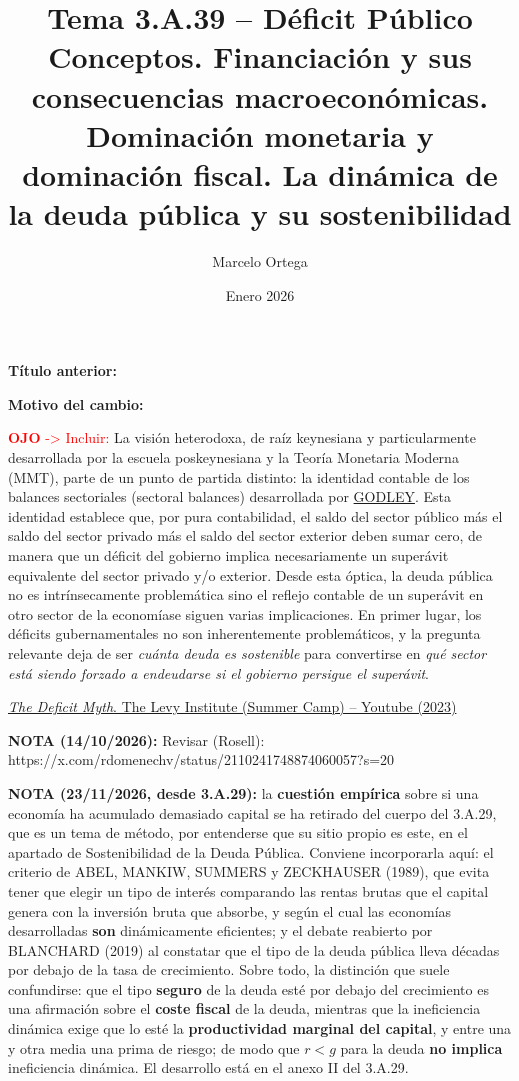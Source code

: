 \documentclass[10pt,a4paper]{article}
\title{Tema 3.A.39 -- Déficit Público\\
\large Conceptos. Financiación y sus consecuencias macroeconómicas. Dominación monetaria y dominación fiscal. La dinámica de la deuda pública y su sostenibilidad}
\author{Marcelo Ortega}
\date{Enero 2026}
\newcommand{\puntosclave}[1]{%
  \begin{tcolorbox}[
    colframe=black,
    title={Puntos clave},
    before upper={\setlength{\parindent}{0.5cm}\setlength{\parskip}{0.5\baselineskip}}
  ]
  #1
  \end{tcolorbox}
}
\newcommand{\modificaciones}[1]{
  \begin{tcolorbox}[
    colback=white,
    colframe=red,
    title={Modificaciones a realizar},
    before upper={\setlength{\parindent}{0.5cm}\setlength{\parskip}{0.5\baselineskip}}
  ]
  #1
  \end{tcolorbox}
}
\newcommand{\changebox}{%
\begin{tcolorbox}[title={Historial de cambios del tema}]
\textbf{Título anterior:} \OldTitle\par
\textbf{Motivo del cambio:} \ChangeWhy
\end{tcolorbox}
}
\newcounter{anexo}
\begin{document}
\maketitle
\changebox

\newpage

\puntosclave{ %
     
     
    }
\vspace{1cm}

\modificaciones{
    \textcolor{red}{\textbf{OJO} -> Incluir:} La visión heterodoxa, de raíz keynesiana y particularmente desarrollada por la escuela poskeynesiana y la Teoría Monetaria Moderna (MMT), parte de un punto de partida distinto: la identidad contable de los balances sectoriales (sectoral balances) desarrollada por \href{https://es.wikipedia.org/wiki/Wynne_Godley}{GODLEY}. Esta identidad establece que, por pura contabilidad, el saldo del sector público más el saldo del sector privado más el saldo del sector exterior deben sumar cero, de manera que un déficit del gobierno implica necesariamente un superávit equivalente del sector privado y/o exterior. Desde esta óptica, la deuda pública no es intrínsecamente problemática sino el reflejo contable de un superávit en otro sector de la economíase siguen varias implicaciones. En primer lugar, los déficits gubernamentales no son inherentemente problemáticos, y la pregunta relevante deja de ser \textit{cuánta deuda es sostenible} para convertirse en \textit{qué sector está siendo forzado a endeudarse si el gobierno persigue el superávit}. 

    \href{https://www.youtube.com/watch?v=V_KqjvXoBPM&list=PLGGYihhM4K20lKnh051Q4tZcLmZxndmN-&index=3}{\textit{ The Deficit Myth}. The Levy Institute (Summer Camp) -- Youtube (2023)}

    \textbf{NOTA (14/10/2026):} Revisar (Rosell): https://x.com/rdomenechv/status/2110241748874060057?s=20

    \textbf{NOTA (23/11/2026, desde 3.A.29):} la \textbf{cuestión empírica} sobre si una economía ha acumulado demasiado capital se ha retirado del cuerpo del 3.A.29, que es un tema de método, por entenderse que su sitio propio es este, en el apartado de Sostenibilidad de la Deuda Pública. Conviene incorporarla aquí: el criterio de ABEL, MANKIW, SUMMERS y ZECKHAUSER (1989), que evita tener que elegir un tipo de interés comparando las rentas brutas que el capital genera con la inversión bruta que absorbe, y según el cual las economías desarrolladas \textbf{son} dinámicamente eficientes; y el debate reabierto por BLANCHARD (2019) al constatar que el tipo de la deuda pública lleva décadas por debajo de la tasa de crecimiento. Sobre todo, la distinción que suele confundirse: que el tipo \textbf{seguro} de la deuda esté por debajo del crecimiento es una afirmación sobre el \textbf{coste fiscal} de la deuda, mientras que la ineficiencia dinámica exige que lo esté la \textbf{productividad marginal del capital}, y entre una y otra media una prima de riesgo; de modo que $r<g$ para la deuda \textbf{no implica} ineficiencia dinámica. El desarrollo está en el anexo II del 3.A.29.


}
\end{document}
